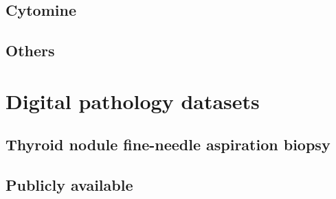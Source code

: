 \subsection{Cytomine}

\subsection{Others}

\section{Digital pathology datasets}
\label{sec:backdp:dataset}




\subsection{Thyroid nodule fine-needle aspiration biopsy}



\subsection{Publicly available}